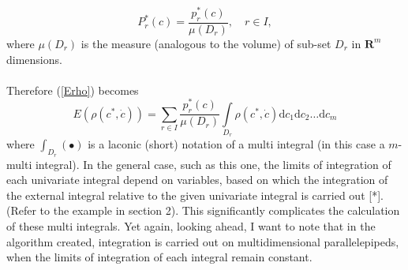 \documentclass[a4paper]{article}
\numberwithin{equation}{subsection}
\begin{document}
\begin{equation}
P_{r}^{*}(c)=\frac{p_{r}^{*}(c)}{\mu(D_{r})}, \quad r \in I,
\end{equation}
where $\mu(D_{r})$ is the measure (analogous to the volume) of sub-set $D_{r}$ in $\boldsymbol{R}^{m}$ dimensions. \\
\\
Therefore (\ref{Erho}) becomes
\begin{equation}
E(\rho(c^{*},\dot{c}))=\sum\limits_{r \in I} \frac{p_{r}^{*}(c)}{\mu(D_{r})} \int\limits_{D_{r}}\rho(c^{*},\dot{c})\mathrm{d}c_{1}\mathrm{d}c_{2}\dots \mathrm{d}c_{m} \label{mathexpectancy}
\end{equation}
where $\int_ {D_{r}}(\bullet)$ is a laconic (short) notation of a multi integral (in this case a $m$-multi integral). In the general case, such as this one, the limits of integration of each univariate integral depend on variables, based on which the integration of the external integral relative to the given univariate integral is carried out [*]. (Refer to the example in section 2). This significantly complicates the calculation of these multi integrals. Yet again, looking ahead, I want to note that in the algorithm created, integration is carried out on multidimensional parallelepipeds, when the limits of integration of each integral remain constant. \\
\\
\end{document}
